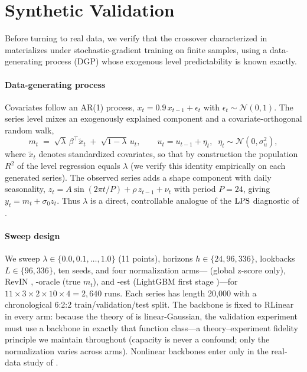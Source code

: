 \section{Synthetic Validation}\label{sec:synthetic}

Before turning to real data, we verify that the crossover characterized in  materializes under stochastic-gradient training on finite samples, using a data-generating process (DGP) whose exogenous level predictability is known exactly.

\paragraph{Data-generating process}
Covariates follow an AR(1) process, $x_t = 0.9\,x_{t-1} + \epsilon_t$ with $\epsilon_t \sim \mathcal{N}(0,1)$. The series level mixes an exogenously explained component and a covariate-orthogonal random walk,
\[
m_t \;=\; \sqrt{\lambda}\,\beta^\top \tilde{x}_t \;+\; \sqrt{1-\lambda}\,u_t,
\qquad u_t = u_{t-1} + \eta_t,\;\; \eta_t \sim \mathcal{N}(0,\sigma_u^2),
\]
where $\tilde{x}_t$ denotes standardized covariates, so that by construction the population $R^2$ of the level regression equals $\lambda$ (we verify this identity empirically on each generated series). The observed series adds a shape component with daily seasonality, $z_t = A\sin(2\pi t/P) + \rho\,z_{t-1} + \nu_t$ with period $P=24$, giving $y_t = m_t + \sigma_0 z_t$. Thus $\lambda$ is a direct, controllable analogue of the $\mathrm{LPS}$ diagnostic of .

\paragraph{Sweep design}
We sweep $\lambda \in \{0.0, 0.1, \dots, 1.0\}$ (11 points), horizons $h \in \{24, 96, 336\}$, lookbacks $L \in \{96, 336\}$, ten seeds, and four normalization arms---\rawm{} (global z-score only), RevIN \citep{kim2022revin}, \cnm-oracle (true $m_t$), and \cnm-est (LightGBM first stage \citep{ke2017lightgbm})---for $11 \times 3 \times 2 \times 10 \times 4 = 2{,}640$ runs. Each series has length 20{,}000 with a chronological 6:2:2 train/validation/test split. The backbone is fixed to RLinear \citep{li2023rlinear} in every arm: because the theory of  is linear-Gaussian, the validation experiment must use a backbone in exactly that function class---a theory--experiment fidelity principle we maintain throughout (capacity is never a confound; only the normalization varies across arms). Nonlinear backbones enter only in the real-data study of .

